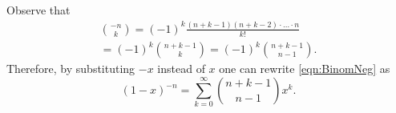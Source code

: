 

\setcounter{section}{2}
\setcounter{subsection}{4}
\setcounter{dfn}{13}

\begin{rem}
Observe that
\begin{multline*}
\binom{-n}{k} = (-1)^k \frac{(n+k-1) (n+k-2) \cdot \ldots \cdot n}{k!}\\
= (-1)^k \binom{n+k-1}{k} = (-1)^k \binom{n+k-1}{n-1}.
\end{multline*}
Therefore, by substituting $-x$ instead of $x$ one can rewrite \eqref{eqn:BinomNeg} as
\[
(1-x)^{-n} = \sum_{k=0}^\infty \binom{n+k-1}{n-1} x^k.
\]
\end{rem}



